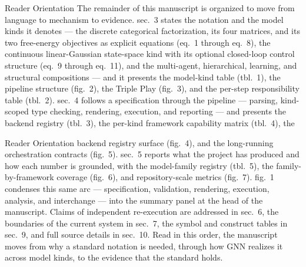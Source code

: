 \documentclass[
  ignorenonframetext,
]{beamer}
\begin{document}
\begin{frame}[allowframebreaks]{Reader Orientation}
\protect{}\label{reader-orientation}
The remainder of this manuscript is organized to move from language to
mechanism to evidence. sec.~3 states the notation
and the model kinds it denotes --- the discrete categorical
factorization, its four matrices, and its two free-energy objectives as
explicit equations (eq.~1 through
eq.~8), the continuous linear-Gaussian state-space kind
with its optional closed-loop control structure
(eq.~9 through eq.~11), and the
multi-agent, hierarchical, learning, and structural compositions --- and
it presents the model-kind table (tbl.~1), the
pipeline structure (fig.~2), the Triple Play
(fig.~3), and the per-step responsibility table
(tbl.~2). sec.~4 follows a
specification through the pipeline --- parsing, kind-scoped type
checking, rendering, execution, and reporting --- and presents the
backend registry (tbl.~3), the per-kind
framework capability matrix (tbl.~4), the
\end{frame}

\begin{frame}[allowframebreaks]{Reader Orientation}
backend registry surface (fig.~4), and the
long-running orchestration contracts (fig.~5).
sec.~5 reports what the project has produced
and how each number is grounded, with the model-family registry
(tbl.~5), the family-by-framework coverage
(fig.~6), and repository-scale metrics
(fig.~7). fig.~1
condenses this same arc --- specification, validation, rendering,
execution, analysis, and interchange --- into the summary panel at the
head of the manuscript. Claims of independent re-execution are addressed
in sec.~6, the boundaries of the current system
in sec.~7, the symbol and construct
tables in sec.~9, and full source details in
sec.~10. Read in this order, the manuscript moves from
why a standard notation is needed, through how GNN realizes it across
model kinds, to the evidence that the standard holds.
\end{frame}
\end{document}

